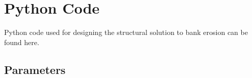 \chapter{Python Code}

Python code used for designing the structural solution to bank erosion can be found here.


\begin{comment}
\begin{lstlisting}[language=Python]
"""
ISA Calculator: import the function, specify the height and it will return a
list in the following format: [Temperature,Density,Pressure,Speed of Sound].
Note that there is no check to see if the maximum altitude is reached.
"""

import math
g0 = 9.80665
R = 287.0
layer1 = [0, 288.15, 101325.0]
alt = [0,11000,20000,32000,47000,51000,71000,86000]
a = [-.0065,0,.0010,.0028,0,-.0028,-.0020]

def atmosphere(h):
    for i in range(0,len(alt)-1):
        if h >= alt[i]:
            layer0 = layer1[:]
            layer1[0] = min(h,alt[i+1])
            if a[i] != 0:
                layer1[1] = layer0[1] + a[i]*(layer1[0]-layer0[0])
                layer1[2] = layer0[2] * (layer1[1]/layer0[1])**(-g0/(a[i]*R))
            else:
                layer1[2] = layer0[2]*math.exp((-g0/(R*layer1[1]))*(layer1[0]-layer0[0]))
    return [layer1[1],layer1[2]/(R*layer1[1]),layer1[2],math.sqrt(1.4*R*layer1[1])]
\end{lstlisting}
\end{comment}

\section{Parameters}

